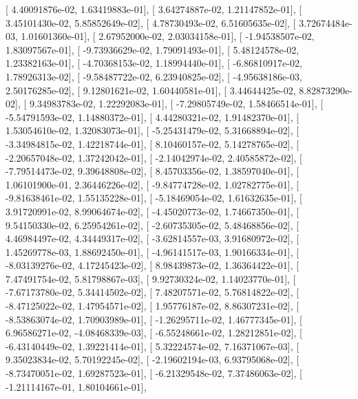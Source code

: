 \documentclass{article}
\begin{document}
       [  4.40091876e-02,   1.63419883e-01],
       [  3.64274887e-02,   1.21147852e-01],
       [  3.45101430e-02,   5.85852649e-02],
       [  4.78730493e-02,   6.51605635e-02],
       [  3.72674484e-03,   1.01601360e-01],
       [  2.67952000e-02,   2.03034158e-01],
       [ -1.94538507e-02,   1.83097567e-01],
       [ -9.73936629e-02,   1.79091493e-01],
       [  5.48124578e-02,   1.23382163e-01],
       [ -4.70368153e-02,   1.18994440e-01],
       [ -6.86810917e-02,   1.78926313e-02],
       [ -9.58487722e-02,   6.23940825e-02],
       [ -4.95638186e-03,   2.50176285e-02],
       [  9.12801621e-02,   1.60440581e-01],
       [  3.44644425e-02,   8.82873290e-02],
       [  9.34983783e-02,   1.22292083e-01],
       [ -7.29805749e-02,   1.58466514e-01],
       [ -5.54791593e-02,   1.14880372e-01],
       [  4.44280321e-02,   1.91482370e-01],
       [  1.53054610e-02,   1.32083073e-01],
       [ -5.25431479e-02,   5.31668894e-02],
       [ -3.34984815e-02,   1.42218744e-01],
       [  8.10460157e-02,   5.14278765e-02],
       [ -2.20657048e-02,   1.37242042e-01],
       [ -2.14042974e-02,   2.40585872e-02],
       [ -7.79514473e-02,   9.39648808e-02],
       [  8.45703356e-02,   1.38597040e-01],
       [  1.06101900e-01,   2.36446226e-02],
       [ -9.84774728e-02,   1.02782775e-01],
       [ -9.81638461e-02,   1.55135228e-01],
       [ -5.18469054e-02,   1.61632635e-01],
       [  3.91720991e-02,   8.99064674e-02],
       [ -4.45020773e-02,   1.74667350e-01],
       [  9.54150330e-02,   6.25954261e-02],
       [ -2.60735305e-02,   5.48468856e-02],
       [  4.46984497e-02,   4.34449317e-02],
       [ -3.62814557e-03,   3.91680972e-02],
       [  1.45269778e-03,   1.88692450e-01],
       [ -4.96141517e-03,   1.90166334e-01],
       [ -8.03139276e-02,   4.17245423e-02],
       [  8.98439873e-02,   1.36364422e-01],
       [  7.47491754e-02,   5.81798867e-03],
       [  9.92730324e-02,   1.14023770e-01],
       [ -7.67173780e-02,   5.34414502e-02],
       [  7.48207571e-02,   5.76814822e-02],
       [ -8.47125022e-02,   1.47954571e-02],
       [  1.95776187e-02,   8.86307231e-02],
       [ -8.53863074e-02,   1.70903989e-01],
       [ -1.26295711e-02,   1.46777345e-01],
       [  6.96586271e-02,  -4.08468339e-03],
       [ -6.55248661e-02,   1.28212851e-02],
       [ -6.43140449e-02,   1.39221414e-01],
       [  5.32224574e-02,   7.16371067e-03],
       [  9.35023834e-02,   5.70192245e-02],
       [ -2.19602194e-03,   6.93795068e-02],
       [ -8.73470051e-02,   1.69287523e-01],
       [ -6.21329548e-02,   7.37486063e-02],
       [ -1.21114167e-01,   1.80104661e-01],
\end{document}
